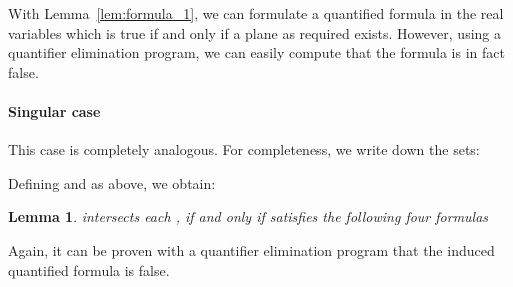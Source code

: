 \documentclass[12pt]{article}
\newtheorem{lemma}[theorem]{Lemma}
\begin{document}
\begin{appendix}
With Lemma~\ref{lem:formula_1}, we can formulate a quantified formula in the real variables 
 which is true if and only if a plane  as required exists. However, using
a quantifier elimination program, we can easily compute that the formula is in fact false.

\paragraph{Singular case} This case is completely analogous. For completeness, we write down
the sets:


Defining  and  as above, we obtain:

\begin{lemma}\label{lem:formula_2}
 intersects each ,  if and only if  satisfies the following four formulas


\end{lemma}

Again, it can be proven with a quantifier elimination program that the induced quantified formula
is false.


\end{appendix}
\end{document}
